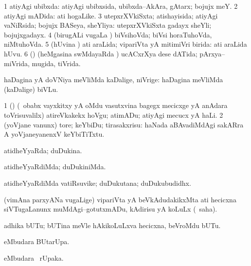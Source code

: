 \bentry
{}
\gl{\gu}
\bmng
\bnum
\num{1} atiyAgi ubibxda:  atiyAgi ubibxsida, ubibxda--AkAra, gAtarx; bojujx meY. 
\num{2} atiyAgi mADida:  ati hogaLike. 
\num{3} utepxrXVkiSxta; atishayisida; atiyAgi vaNiRsida; bojujx BASeya, sheYliya:  utepxrXVkiSxta gadayx sheYli; bojujxgadayx. 
\num{4} (birugALi \mo vugaLa \vi) biVsihoVda; biVsi horaTuhoVda, niMtuhoVda. 
\num{5} (hUvina \vi) ati araLida; vipariVta yA mitimiVri birida:  ati araLida hUvu. 
\num{6} (\rUpa) (heMgasina swMdayaRda \vi) ucACxrXya dese dATida; pArxya--miVrida, mugida, tiVrida. 
\enum
\emng
\eentry

\bentry
{}
\gl{\kirxvi}
\bmng
haDagina yA doVNiya meVliMda kaDalige, niVrige:  haDagina meVliMda (kaDalige) biVLu. 
\emng

\noindent
\gl{\pagu}
\bmng
\bnum
\num{1}  (\AmA) (\kanmu\ obabx vayxkitxy yA oMdu vasutxvina bagegx mecicxge yA anAdara toVrisuvalilx) atireVkakekx hoVgu; atimADu; atiyAgi mecucx yA haLi. 
\num{2}  (yoVjane \mo vanunx) tore; keYbiDu; tirasakxrisu:  haNada aBAvadiMdAgi sakARra A yoVjaneyanenxV keYbiTiTxtu. 
\enum
\emng
\eentry

\bentry
{}
\gl{\gu}
\bmng
atidheYyaRda; duDukina. 
\emng
\eentry

\bentry
{}
\gl{\kirxvi}
\bmng
atidheYyaRdiMda; duDukiniMda. 
\emng
\eentry

\bentry
{}
\gl{\nA}
\bmng
atidheYyaRdiMda vatiRsuvike; duDukutana; duDukubudidhx. 
\emng
\eentry

\bentry
{}
\gl{\sakirx}
\bmng
(vimAna parxyANa \mo vugaLige) vipariVta yA beVkAdudakikxMta ati hecicxna siVTugaLanunx muMdAgi--gotutxmADu, kAdirisu yA koLuLx (\akirx\ saha). 
\emng
\eentry

\bentry
{}
\gl{\nA}
\bmng
adhika bUTu; bUTina meVle hAkikoLuLxva hecicxna, beVroMdu bUTu. 
\emng
\eentry

\bentry
{}
\gl{\kirx}
\bmng
{} eMbudara BUtarUpa. 
\emng
\eentry

\bentry
{}
\gl{\kirx}
\bmng
{} eMbudara \BUkaq\ rUpaka. 
\emng
\eentry

